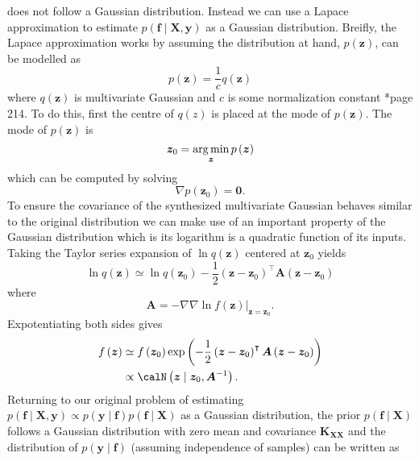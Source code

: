 does not follow a Gaussian distribution. Instead we can use a Lapace approximation to estimate $p \left( \bm{f} \mid \bm{X} , \bm{y} \right)$ as a Gaussian distribution. Breifly, the Lapace approximation works by assuming the distribution at hand, $p \left( \bm{z} \right)$, can be modelled as
\begin{equation*}
    p \left( \bm{z} \right) = \frac{1}{c} q \left( \bm{z} \right)
\end{equation*}
where $q \left( \bm{z} \right)$ is multivariate Gaussian and $c$ is some normalization constant \cite{BishopChristopherM2006Pram}*{page 214}. To do this, first the centre of $q \left( z \right)$ is placed at the mode of $p \left( \bm{z} \right)$. The mode of $p \left( \bm{z} \right)$ is
\begin{equation*}
    \bm{z}_0 = \operatorname*{\arg\min}_{\bm{z}} p \left( \bm{z} \right)
\end{equation*}
which can be computed by solving
\begin{equation} \label{eq: lapace-grad-zero}
    \nabla p \left( \bm{z}_0 \right) = \bm{0}.
\end{equation}
To ensure the covariance of the synthesized multivariate Gaussian behaves similar to the original distribution we can make use of an important property of the Gaussian distribution which is its logarithm is a quadratic function of its inputs. Taking the Taylor series expansion of $\ln q \left( \bm{z} \right)$ centered at $\bm{z}_0$ yields
\begin{equation*}
    \ln q \left( \bm{z} \right) \simeq \ln q \left( \bm{z}_0 \right) - \frac{1}{2} \left( \bm{z} - \bm{z}_0 \right)^{\intercal} \bm{A} \left( \bm{z} - \bm{z}_0 \right)
\end{equation*}
where
\begin{equation*}
    \bm{A} = - \nabla \nabla \left. \ln f \left( \bm{z} \right) \right|_{\bm{z} = \bm{z}_0}.
\end{equation*}
Expotentiating both sides gives
\begin{align}
    f \left( \bm{z} \right)
     & \simeq f \left( \bm{z}_0 \right) \exp \left( - \frac{1}{2} \left( \bm{z} - \bm{z}_0 \right)^{\intercal} \bm{A} \left( \bm{z} - \bm{z}_0 \right) \right) \nonumber \\
     & \propto \calN \left( \bm{z} \mid \bm{z}_0 , \bm{A}^{-1} \right) \label{eq: lapace-gauss-apprx} .
\end{align}
Returning to our original problem of estimating $p \left( \bm{f} \mid \bm{X} , \bm{y} \right) \propto p \left( \bm{y} \mid \bm{f} \right) p \left( \bm{f} \mid \bm{X} \right)$ as a Gaussian distribution, the prior $p \left( \bm{f} \mid \bm{X} \right)$ follows a Gaussian distribution with zero mean and covariance $\bm{K}_{\bm{X} \bm{X}}$ and the distribution of $p \left( \bm{y} \mid \bm{f} \right)$ (assuming independence of samples) can be written as
